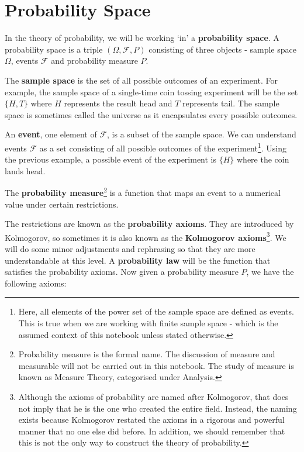 \documentclass[11pt, a4paper, oneside]{book}
\theoremstyle{definition}
\begin{document}
\section{Probability Space}

In the theory of probability, we will be working `in' a \textbf{probability space}. A probability space is a triple $(\Omega, \mathcal{F}, P)$ consisting of three objects - {sample space} $\Omega$, {events} $\mathcal{F}$ and {probability measure} $P$. 

\noindent The \textbf{sample space} is the set of all possible outcomes of an experiment. For example, the sample space of a single-time coin tossing experiment will be the set $\{ H, T\}$ where $H$ represents the result head and $T$ represents tail. The sample space is sometimes called the universe  as it encapsulates every possible outcomes. 

\noindent An \textbf{event}, one element of $\mathcal{F}$, is a subset of the sample space. We can understand events $\mathcal{F}$ as a set consisting of all possible outcomes of the experiment\footnote{Here, all elements of the power set of the sample space are defined as events. This is true when we are working with finite sample space - which is the assumed context of this notebook unless stated otherwise.}. Using the previous example, a possible event of the experiment is $\{ H \}$ where the coin lands head. 

\noindent The \textbf{probability measure}\footnote{Probability measure is the formal name. The discussion of measure and measurable will not be carried out in this notebook. The study of measure is known as Measure Theory, categorised under Analysis.} is a function that maps an event to a numerical value under certain restrictions. 

\noindent The restrictions are known as the \textbf{probability axioms}. They are introduced by Kolmogorov, so sometimes it is also known as the \textbf{Kolmogorov axioms}\footnote{Although the axioms of probability are named after Kolmogorov, that does not imply that he is the one who created the entire field. Instead, the naming exists because Kolmogorov restated the axioms in a rigorous and powerful manner that no one else did before. In addition, we should remember that this is not the only way to construct the theory of probability.}. We will do some minor adjustments and rephrasing so that they are more understandable at this level. A \textbf{probability law} will be the function that satisfies the probability axioms. Now given a probability measure $P$, we have the following axioms:
\end{document}
